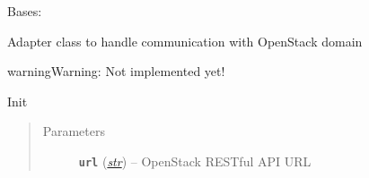 \documentclass[letterpaper,10pt,english]{sphinxmanual}
\begin{document}
\begin{fulllineitems}
\label{adapt/domain_adapters:escape.adapt.domain_adapters.OpenStackDomainManager}
Bases: {\hyperref[util/adapter:escape.util.adapter.AbstractDomainManager]{\emph{}}}

Adapter class to handle communication with OpenStack domain

\begin{notice}{warning}{Warning:}
Not implemented yet!
\end{notice}

\begin{fulllineitems}
\label{adapt/domain_adapters:escape.adapt.domain_adapters.OpenStackDomainManager.name}
\end{fulllineitems}


\begin{fulllineitems}
\label{adapt/domain_adapters:escape.adapt.domain_adapters.OpenStackDomainManager.__init__}
Init
\begin{quote}\begin{description}
\item[{Parameters}] \leavevmode
\textbf{\texttt{url}} (\href{https://docs.python.org/2.7/library/functions.html\#str}{\emph{str}}) -- OpenStack RESTful API URL

\end{description}\end{quote}

\end{fulllineitems}


\begin{fulllineitems}
\label{adapt/domain_adapters:escape.adapt.domain_adapters.OpenStackDomainManager.install_nffg}
\end{fulllineitems}


\end{fulllineitems}
\end{document}
